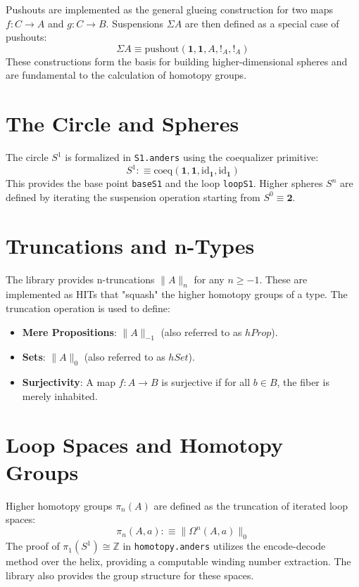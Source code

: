 \documentclass[11pt]{article}
\begin{document}
Pushouts are implemented as the general glueing construction for two maps $f : C \to A$ and $g : C \to B$. Suspensions $\Sigma A$ are then defined as a special case of pushouts:
\begin{equation}
    \Sigma A \equiv \text{pushout}(\mathbf{1}, \mathbf{1}, A, !_A, !_A)
\end{equation}
These constructions form the basis for building higher-dimensional spheres and are fundamental to the calculation of homotopy groups.

\section{The Circle and Spheres}

The circle $S^1$ is formalized in \texttt{S1.anders} using the coequalizer primitive:
\begin{equation}
    S^1 :\equiv \text{coeq}(\mathbf{1}, \mathbf{1}, \text{id}_{\mathbf{1}}, \text{id}_{\mathbf{1}})
\end{equation}
This provides the base point \texttt{baseS1} and the loop \texttt{loopS1}. Higher spheres $S^n$ are defined by iterating the suspension operation starting from $S^0 \equiv \mathbf{2}$.

\section{Truncations and n-Types}

The library provides n-truncations $\| A \|_n$ for any $n \ge -1$. These are implemented as HITs that "squash" the higher homotopy groups of a type. The truncation operation is used to define:
\begin{itemize}
    \item \textbf{Mere Propositions}: $\| A \|_{-1}$ (also referred to as $hProp$).
    \item \textbf{Sets}: $\| A \|_0$ (also referred to as $hSet$).
    \item \textbf{Surjectivity}: A map $f : A \to B$ is surjective if for all $b \in B$, the fiber is merely inhabited.
\end{itemize}

\section{Loop Spaces and Homotopy Groups}

Higher homotopy groups $\pi_n(A)$ are defined as the truncation of iterated loop spaces:
\begin{equation}
    \pi_n(A, a) :\equiv \| \Omega^n(A, a) \|_0
\end{equation}
The proof of $\pi_1(S^1) \cong \mathbb{Z}$ in \texttt{homotopy.anders} utilizes the encode-decode method over the helix, providing a computable winding number extraction. The library also provides the group structure for these spaces.
\end{document}
